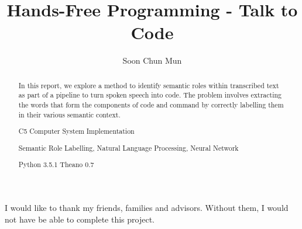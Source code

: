 \documentclass[fyp]{socreport}
\begin{document}

\title{Hands-Free Programming - Talk to Code}
\author{Soon Chun Mun}

\maketitle

\newcommand{\vp}{$\vphantom{equals to}$}
\newcommand{\tagw}[3]{$\underbrace{\hbox{\vp #1}}_{\hbox{\color{#3} \vp \textbf{#2}}}$}
\newcommand{\tago}[1]{\tagw{#1}{O}{Grey}}
\newcommand{\tagfor}[1]{\tagw{#1}{for}{red}}
\newcommand{\tagfi}[1]{\tagw{#1}{iters}{red}}

\newcommand{\tagfn}[1]{\tagw{#1}{fn-name}{Blue}}

\newcommand{\tagcond}[1]{\tagw{#1}{cond}{blue}}
\newcommand{\tagif}[1]{\tagw{#1}{if}{blue}}
\newcommand{\tagvn}[1]{$\underbrace{\hbox{\vp #1}}_{\hbox{\vp \textbf{{\color{ForestGreen} var}-name}}}$}
\newcommand{\tagvv}[1]{$\underbrace{\hbox{\vp #1}}_{\hbox{\vp \textbf{{\color{ForestGreen} var}-val}}}$}
\newcommand{\tagvm}[1]{$\underbrace{\hbox{\vp #1}}_{\hbox{\vp \textbf{{\color{ForestGreen} var}-mod}}}$}
\newcommand{\tagva}[1]{$\underbrace{\hbox{\vp #1}}_{\hbox{\vp \textbf{{\color{ForestGreen} var}-ass}}}$}

\begin{abstract}

In this report, we explore a method to identify semantic roles within
transcribed text as part of a pipeline to turn spoken speech into
code. The problem involves extracting the words that form the components
of code and command by correctly labelling them in their various semantic
context.

\begin{descriptors}
    \item C5 Computer System Implementation
\end{descriptors}
\begin{keywords}
	Semantic Role Labelling, Natural Language Processing, Neural Network
\end{keywords}
\begin{implement}
	Python 3.5.1 Theano 0.7
\end{implement}
\end{abstract}

\begin{acknowledgement}
   I would like to thank my friends, families and advisors.
   Without them, I would not have be able to complete this project.
\end{acknowledgement}
\end{document}
